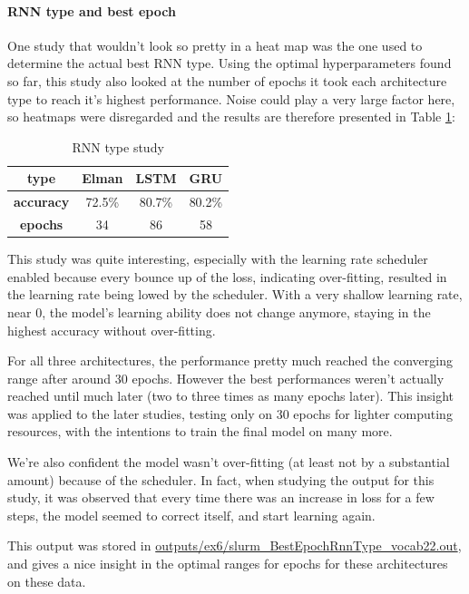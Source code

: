 \paragraph{RNN type and best epoch}
One study that wouldn't look so pretty in a heat map was the one used to determine the actual best RNN type. Using the optimal hyperparameters found so far, this study also looked at the number of epochs it took each architecture type to reach it's highest performance. Noise could play a very large factor here, so heatmaps were disregarded and the results are therefore presented in Table \ref{tab:rnn_type}:

\begin{table}[H]
    \centering
    \begin{tabular}{c|c|c|c}
        \textbf{type}    & Elman & LSTM & GRU  \\
        \hline
        \textbf{accuracy}   & 72.5\% & 80.7\% & 80.2\% \\
        \hline
        \textbf{epochs}  & 34    & 86    & 58  \\
    \end{tabular}
    \caption{RNN type study}
    \label{tab:rnn_type}
\end{table}

This study was quite interesting, especially with the learning rate scheduler enabled because every bounce up of the loss, indicating over-fitting, resulted in the learning rate being lowed by the scheduler. With a very shallow learning rate, near 0, the model's learning ability does not change anymore, staying in the highest accuracy without over-fitting.

For all three architectures, the performance pretty much reached the converging range after around 30 epochs. However the best performances weren't actually reached until much later (two to three times as many epochs later). This insight was applied to the later studies, testing only on 30 epochs for lighter computing resources, with the intentions to train the final model on many more.

We're also confident the model wasn't over-fitting (at least not by a substantial amount) because of the scheduler. In fact, when studying the output for this study, it was observed that every time there was an increase in loss for a few steps, the model seemed to correct itself, and start learning again. 

This output was stored in \href{https://github.uio.no/fabior/IN5550/tree/master/Oblig27/outputs/ex6/slurm_PoolTypeRnnType_and_BestEpochRnnType_vocab22.out}
{outputs/ex6/slurm\_BestEpochRnnType\_vocab22.out}, and gives a nice insight in the optimal ranges for epochs for these architectures on these data.

